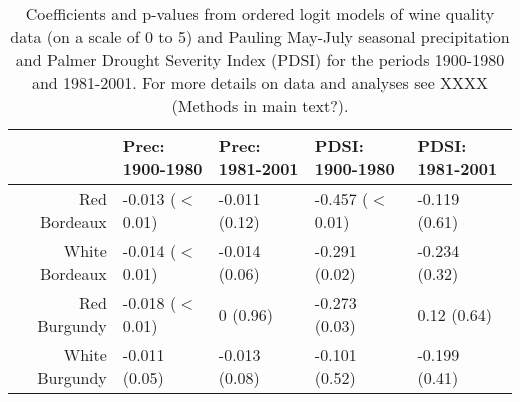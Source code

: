\documentclass{article}
\begin{document}
\begin{table}[ht]
\centering
\caption{Coefficients and p-values from  ordered logit models of wine quality data (on a scale of 0 to 5) and Pauling May-July seasonal precipitation and Palmer Drought Severity Index (PDSI) for the periods 1900-1980 and 1981-2001. For more details on data and analyses see XXXX (Methods in main text?).} 
\begin{tabular}{||r||l|l||l|l||}
  \hline
 & Prec: 1900-1980 & Prec: 1981-2001 & PDSI: 1900-1980 & PDSI: 1981-2001 \\ 
  \hline
Red Bordeaux & -0.013 ($<$0.01) & -0.011 (0.12) & -0.457 ($<$0.01) & -0.119 (0.61) \\ 
  White Bordeaux & -0.014 ($<$0.01) & -0.014 (0.06) & -0.291 (0.02) & -0.234 (0.32) \\ 
  Red Burgundy & -0.018 ($<$0.01) & 0 (0.96) & -0.273 (0.03) & 0.12 (0.64) \\ 
  White Burgundy & -0.011 (0.05) & -0.013 (0.08) & -0.101 (0.52) & -0.199 (0.41) \\ 
   \hline
\end{tabular}
\end{table}
\end{document}
